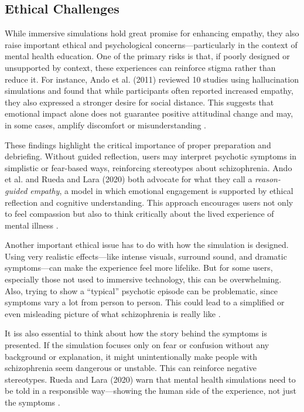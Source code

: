 \subsection{Ethical Challenges}

While immersive simulations hold great promise for enhancing empathy, they also raise important ethical and psychological concerns—particularly in the context of mental health education. One of the primary risks is that, if poorly designed or unsupported by context, these experiences can reinforce stigma rather than reduce it. For instance, Ando et al. (2011) reviewed 10 studies using hallucination simulations and found that while participants often reported increased empathy, they also expressed a stronger desire for social distance. This suggests that emotional impact alone does not guarantee positive attitudinal change and may, in some cases, amplify discomfort or misunderstanding \cite{Ando2011}.

These findings highlight the critical importance of proper preparation and debriefing. Without guided reflection, users may interpret psychotic symptoms in simplistic or fear-based ways, reinforcing stereotypes about schizophrenia. Ando et al. and Rueda and Lara (2020) both advocate for what they call a \textit{reason-guided empathy}, a model in which emotional engagement is supported by ethical reflection and cognitive understanding. This approach encourages users not only to feel compassion but also to think critically about the lived experience of mental illness \cite{Ando2011, Rueda2020}.

Another important ethical issue has to do with how the simulation is designed. Using very realistic effects—like intense visuals, surround sound, and dramatic symptoms—can make the experience feel more lifelike. But for some users, especially those not used to immersive technology, this can be overwhelming. Also, trying to show a “typical” psychotic episode can be problematic, since symptoms vary a lot from person to person. This could lead to a simplified or even misleading picture of what schizophrenia is really like \cite{Zare-Bidaki2022}.

It iss also essential to think about how the story behind the symptoms is presented. If the simulation focuses only on fear or confusion without any background or explanation, it might unintentionally make people with schizophrenia seem dangerous or unstable. This can reinforce negative stereotypes. Rueda and Lara (2020) warn that mental health simulations need to be told in a responsible way—showing the human side of the experience, not just the symptoms \cite{Rueda2020}.

